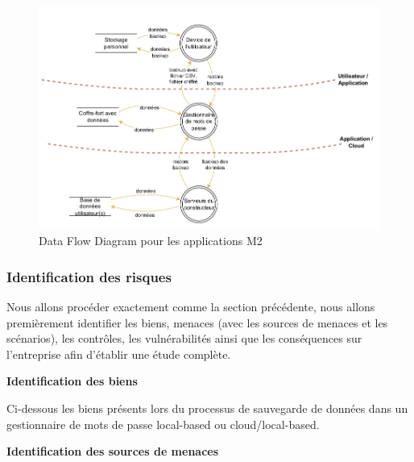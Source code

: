 \begin{figure}[H]
	\includegraphics[width=14.5cm]{images/dfd_backup.png}
	\centering
	\caption{Data Flow Diagram pour les applications M2}
\end{figure}

\subsubsection{Identification des risques}

Nous allons procéder exactement comme la section précédente, nous allons premièrement identifier les biens, menaces (avec les sources de menaces et les scénarios), les contrôles, les vulnérabilités ainsi que les conséquences sur l'entreprise afin d'établir une étude complète.

\textbf{Identification des biens}

Ci-dessous les biens présents lors du processus de sauvegarde de données dans un gestionnaire de mots de passe local-based ou cloud/local-based.

\begin{table}[H]
	\centering
	\caption{Biens des gestionnaires de mots de passe M2}
\end{table}
\textbf{Identification des sources de menaces}

